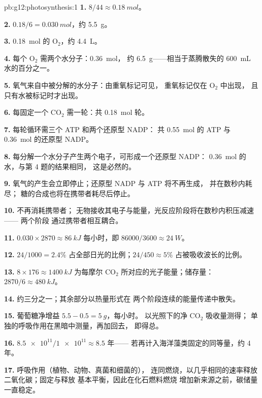 \begin{solution}{pb:g12:photosynthesis:1}
\textbf{1.} $8/44 \approx \qty{0.18}{mol}$。

\textbf{2.} $0.18/6 = \qty{0.030}{mol}$，约 \qty{5.5}{g}。

\textbf{3.} \qty{0.18}{mol} 的 $\mathrm{O_2}$，约 \qty{4.4}{L}。

\textbf{4.} 每个 $\mathrm{O_2}$ 需两个水分子：\qty{0.36}{mol}，
约 \qty{6.5}{g}——相当于蒸腾散失的 \qty{600}{mL} 水的百分之一。

\textbf{5.} 氧气来自中被分解的水分子：由重氧标记可见，
重氧标记仅在 $\mathrm{O_2}$ 中出现，
且只有水被标记时才出现。

\textbf{6.} 每固定一个 $\mathrm{CO_2}$ 需一轮：共 \qty{0.18}{mol} 轮。

\textbf{7.} 每轮循环需三个 ATP 和两个还原型 NADP：
共 \qty{0.55}{mol} 的 ATP 与 \qty{0.36}{mol} 的还原型 NADP。

\textbf{8.} 每分解一个水分子产生两个电子，可形成一个还原型 NADP：
\qty{0.36}{mol} 的水，与第 4 题的结果相同，
这是必然的。

\textbf{9.} 氧气的产生会立即停止；还原型 NADP 与 ATP 将不再生成，
并在数秒内耗尽；
糖的合成也将在携带者耗尽后停止。

\textbf{10.} 不再消耗携带者；
无物接收其电子与能量，光反应阶段将在数秒内积压减速——
两个阶段
通过携带者相互耦合。

\textbf{11.} $0.030 \times 2870 \approx \qty{86}{kJ}$ 每小时，即
$86000/3600 \approx \qty{24}{W}$。

\textbf{12.} $24/1000 = 2.4\%$ 占全部日光的比例；$24/450 \approx
5\%$ 占被吸收波长的比例。

\textbf{13.} $8 \times 176 \approx \qty{1400}{kJ}$ 为每摩尔
$\mathrm{CO_2}$ 所对应的光子能量；储存量：$2870/6 \approx \qty{480}{kJ}$。

\textbf{14.} 约三分之一；其余部分以热量形式在
两个阶段连续的能量传递中散失。

\textbf{15.} 葡萄糖净增益 $5.5 - 0.5 = \qty{5}{g}$，每小时。
以光照下的净 $\mathrm{CO_2}$ 吸收量测得；
单独的呼吸作用在黑暗中测量，再加回去，
即得总。

\textbf{16.} $\num{8.5e11}/\num{1e11} \approx 8.5$ 年——
若再计入海洋藻类固定的同等量，约 4 年。

\textbf{17.} 呼吸作用（植物、动物、真菌和细菌的），
连同燃烧，以几乎相同的速率释放二氧化碳；固定与释放
基本平衡，因此在化石燃料燃烧
增加新来源之前，碳储量一直稳定。


\end{solution}
